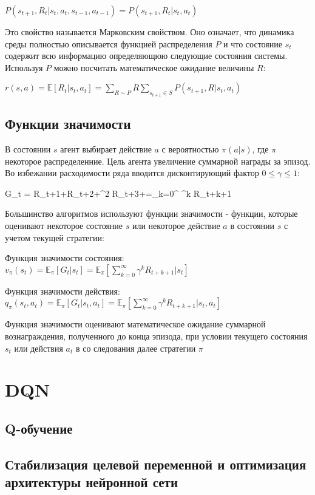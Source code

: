 \documentclass{mipt-thesis-bs}
\begin{document}
$P(s_{t+1}, R_{t}|s_t,a_t,s_{t-1},a_{t-1}) = P(s_{t+1}, R_{t}|s_t,a_t)$

Это свойство называется Марковским свойством. Оно означает, что динамика среды полностью описывается функцией распределения $P$ и что состояние $s_t$ содержит всю информацию определяющюю следующие состояния системы. Используя $P$ можно посчитать математическое ожидание величины $R$:

$r(s, a) = \mathbb{E}[R_{t} | s_t, a_t]=\sum_{R \sim P} R \sum_{s_{t+1} \in S} P(s_{t+1}, R | s_t, a_t)$



\section{Функции значимости}

В состоянии $s$ агент выбирает действие $a$ с вероятностью $\pi(a|s)$, где $\pi$ некоторое распределенние. Цель агента увеличение суммарной награды за эпизод. Во избежании расходимости ряда вводится дисконтирующий фактор $0 \leq\gamma\leq 1$:

G_{t} = R_{t+1}+\gamma R_{t+2}+\gamma^{2} R_{t+3}+\cdots=\sum_{k=0}^{\infty} \gamma^{k} R_{t+k+1}

Большинство алгоритмов используют функции значимости - функции, которые оценивают некоторое состояние $s$ или некоторое действие $a$ в состоянии $s$ с учетом текущей стратегии:

Функция значимости состояния: $v_{\pi}(s_t) = \mathbb{E}_{\pi}[G_{t} | s_t]=\mathbb{E}_{\pi}[\sum_{k=0}^{\infty} \gamma^{k} R_{t+k+1} | s_t]$ 
 
Функция значимости действия: $q_{\pi}(s_t, a_t) = \mathbb{E}_{\pi}[G_{t} | s_{t}, a_{t}]=\mathbb{E}_{\pi}[\sum_{k=0}^{\infty} \gamma^{k} R_{t+k+1} | s_{t}, a_{t}]$

Функция значимости оценивают математическое ожидание суммарной вознаграждения, полученного до конца эпизода, при условии текущего состояния $s_t$ или действия $a_t$ в со следования далее стратегии $\pi$

\chapter{DQN}
\section{Q-обучение}
\section{Стабилизация целевой переменной и оптимизация архитектуры нейронной сети}
\end{document}
